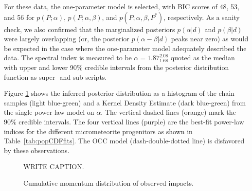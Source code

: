 \documentclass[twocolumn, trackchanges]{aastex62}
\newcommand{\red}[1]{\textcolor{red}{#1}}
\begin{document}
For these data, the one-parameter model is selected, with BIC scores of 48, 53, and 56  for $p(P;\alpha)$, $p(P;\alpha,\beta)$, and $p(P;\alpha,\beta,P^*)$, respectively. 
As a sanity check, we also confirmed that the marginalized posteriors $p(\alpha | d)$ and $p(\beta | d)$ were largely overlapping (or, the posterior $p(\alpha-\beta|d)$ peaks near zero) as would be expected in the case where the one-parameter model adequately described the data.
The spectral index is measured to be
$\alpha = 1.87^{2.08}_{1.68}$ 
quoted as the median with upper and lower 90\% credible intervals from the posterior distribution function as super- and sub-scripts.

Figure \ref{fig:PDF_P} shows the inferred posterior distribution as a histogram of the chain samples (light blue-green) and a Kernel Density Estimate (dark blue-green) from the single-power-law model on $\alpha$. The vertical dashed lines (orange) mark the 90\% credible intervals.  The four vertical lines (purple) are the best-fit power-law indices for the different micrometeorite progenitors as shown in Table~\ref{tab:popCDFfits}. The OCC model (dash-double-dotted line) is disfavored by these observations.



\begin{figure}[h!]
\vspace*{-8mm}
\caption{WRITE CAPTION. \label{fig:PDF_P}}
\end{figure}

\begin{figure}[h!]
\vspace*{-8mm}
\caption{Cumulative momentum distribution of observed impacts. \label{fig:CDF_P}}
\end{figure}
\end{document}
